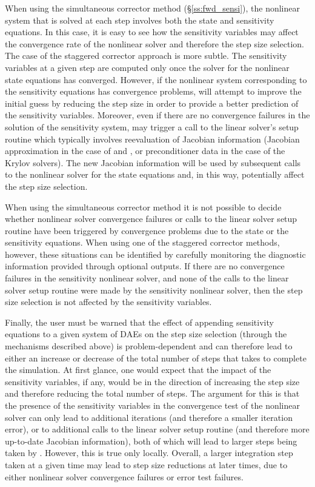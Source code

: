 When using the simultaneous corrector method (\S\ref{ss:fwd_sensi}),
the nonlinear system that is solved at each step involves both the state
and sensitivity equations. In this case, it is easy to see how the sensitivity 
variables may affect the convergence rate of the nonlinear solver and therefore
the step size selection. 
The case of the staggered corrector approach is more subtle. The sensitivity 
variables at a given step are 
computed only once the solver for the nonlinear state equations has converged.
However, if the nonlinear system corresponding to the sensitivity equations
has convergence problems, {\idas} will attempt to improve the initial guess
by reducing the step size in order to provide a better prediction of the
sensitivity variables. Moreover, even if there are no convergence failures in
the solution of the sensitivity system, {\idas} may trigger a call to the
linear solver's setup routine which typically involves reevaluation of Jacobian
information (Jacobian approximation in the case of {\idadense} and {\idaband}, or
preconditioner data in the case of the Krylov solvers). The new Jacobian information
will be used by subsequent calls to the nonlinear solver for the state equations
and, in this way, potentially affect the step size selection.

When using the simultaneous corrector method it is not possible to decide whether 
nonlinear solver convergence failures or calls to the linear solver setup routine
have been triggered by convergence problems due to the state or the sensitivity 
equations.
When using one of the staggered corrector methods, however, these situations can be 
identified by carefully monitoring the diagnostic information provided through 
optional outputs. If there are no convergence
failures in the sensitivity nonlinear solver, and none
of the calls to the linear solver setup routine were made by the sensitivity
nonlinear solver, then the step size selection is
not affected by the sensitivity variables.

Finally, the user must be warned that the effect of appending sensitivity 
equations to a given system of DAEs on the step size selection 
(through the mechanisms described above) is problem-dependent and can therefore
lead to either an increase or decrease of the total number of steps that {\idas} takes
to complete the simulation. At first glance, one would expect that the impact
of the sensitivity variables, if any, would be in the direction of increasing the
step size and therefore reducing the total number of steps. The argument for this
is that the presence of the sensitivity variables in the convergence test of the
nonlinear solver can only lead to additional iterations (and therefore a smaller
iteration error), or to additional calls to the linear solver setup routine
(and therefore more up-to-date Jacobian information), both of which will lead
to larger steps being taken by {\idas}. However, this is true only locally.
Overall, a larger integration step taken at a given time may lead to 
step size reductions at later times, due to either nonlinear solver convergence
failures or error test failures.
